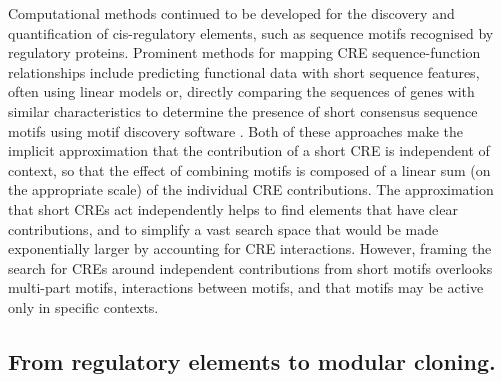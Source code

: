 \documentclass[../main.tex]{subfiles}
\begin{document}
Computational methods continued to be developed for the discovery and quantification of cis-regulatory elements, such as sequence motifs recognised by regulatory proteins.
Prominent methods for mapping CRE sequence-function relationships include predicting functional data with short sequence features, often using linear models \parencite{Shalgi2005,Cheng2017,Vijayabaskar2019} or, directly comparing the sequences of genes with similar characteristics to determine the presence of short
consensus sequence motifs \parencite{Hogan2008,Kretz2013} using motif discovery software \parencite{Elemento2007,Bailey2015}.
Both of these approaches make the implicit approximation that the contribution of a short CRE is independent of context, so that the effect of combining motifs is composed of a linear sum (on the appropriate scale) of the individual CRE contributions.
The approximation that short CREs act independently helps to find elements that have clear contributions, and to simplify a vast search space that would be made exponentially larger by accounting for CRE interactions. 
However, framing the search for CREs around independent contributions from short motifs overlooks multi-part motifs, interactions between motifs, and that motifs may be active only in specific contexts.

\subsection{From regulatory elements to modular cloning.}
\end{document}

